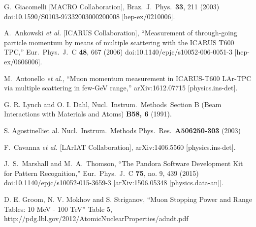 \documentclass[a4paper,11pt]{article}
\begin{document}
\begin{thebibliography}{99}
 
  G.~Giacomelli [MACRO Collaboration],
  Braz.\ J.\ Phys.\  {\bf 33}, 211 (2003)
  doi:10.1590/S0103-97332003000200008
  [hep-ex/0210006].

  A.~Ankowski {\it et al.} [ICARUS Collaboration],
  ``Measurement of through-going particle momentum by means of multiple scattering with the ICARUS T600 TPC,''
  Eur.\ Phys.\ J.\ C {\bf 48}, 667 (2006)
  doi:10.1140/epjc/s10052-006-0051-3
  [hep-ex/0606006].

  M.~Antonello {\it et al.},
  ``Muon momentum measurement in ICARUS-T600 LAr-TPC via multiple scattering in few-GeV range,''
  arXiv:1612.07715 [physics.ins-det].

  G. R. Lynch and O. I. Dahl, Nucl.\ Instrum.\ Methods\, 
  Section B (Beam Interactions with Materials and Atoms) {\bf B58, 6} (1991). 

  S. Agostinelliet al. Nucl.\ Instrum.\ Methods Phys.\ Res.\ {\bf A506250-303} (2003)

  F.~Cavanna {\it et al.} [LArIAT Collaboration],
  arXiv:1406.5560 [physics.ins-det].




  J.~S.~Marshall and M.~A.~Thomson,
  ``The Pandora Software Development Kit for Pattern Recognition,''
  Eur.\ Phys.\ J.\ C {\bf 75}, no. 9, 439 (2015)
  doi:10.1140/epjc/s10052-015-3659-3
  [arXiv:1506.05348 [physics.data-an]].

  D. E. Groom, N. V. Mokhov and S. Striganov, ``Muon Stopping Power and Range Tables: 10 MeV - 100 TeV'' Table 5,
  http://pdg.lbl.gov/2012/AtomicNuclearProperties/adndt.pdf


\end{thebibliography}
\end{document}
